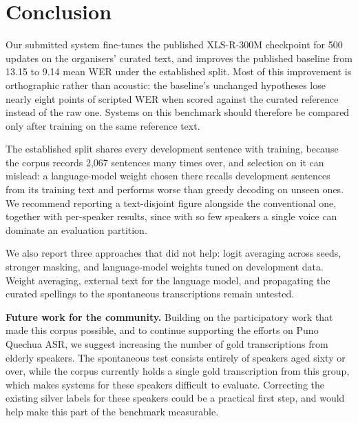 \section{Conclusion}
\label{sec:conclusion}

Our submitted system fine-tunes the published XLS-R-300M checkpoint for 500
updates on the organisers' curated text, and improves the published baseline
from 13.15 to 9.14 mean WER under the established split. Most of this
improvement is orthographic rather than acoustic: the baseline's unchanged
hypotheses lose nearly eight points of scripted WER when scored against the
curated reference instead of the raw one. Systems on this benchmark should
therefore be compared only after training on the same reference text.

The established split shares every development sentence with training, because
the corpus records 2{,}067 sentences many times over, and selection on it can
mislead: a language-model weight chosen there recalls development sentences
from its training text and performs worse than greedy decoding on unseen ones.
We recommend reporting a text-disjoint figure alongside the conventional one,
together with per-speaker results, since with so few speakers a single voice
can dominate an evaluation partition.

We also report three approaches that did not help: logit averaging across
seeds, stronger masking, and language-model weights tuned on development data.
Weight averaging, external text for the language model, and propagating the
curated spellings to the spontaneous transcriptions remain untested.

\textbf{Future work for the community.} Building on the participatory work that
made this corpus possible, and to continue supporting the efforts on Puno
Quechua ASR, we suggest increasing the number of gold transcriptions from
elderly speakers. The spontaneous test consists entirely of speakers aged sixty
or over, while the corpus currently holds a single gold transcription from this
group, which makes systems for these speakers difficult to evaluate. Correcting
the existing silver labels for these speakers could be a practical first step,
and would help make this part of the benchmark measurable.
